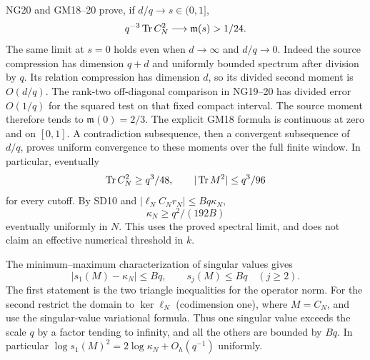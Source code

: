 \documentclass[11pt]{article}
\begin{document}
NG20 and GM18--20 prove, if $d/q\to s\in(0,1]$,
\[
q^{-3}\operatorname{Tr} C_N^2\longrightarrow\mathfrak m(s)>1/24.
\]
The same limit at $s=0$ holds even when $d\to\infty$ and $d/q\to0$.
Indeed the source compression has dimension $q+d$ and uniformly
bounded spectrum after division by $q$. Its relation compression has
dimension $d$, so its divided second moment is $O(d/q)$. The rank-two
off-diagonal comparison in NG19--20 has divided error $O(1/q)$ for
the squared test on that fixed compact interval. The source moment
therefore tends to $\mathfrak m(0)=2/3$. The explicit GM18 formula
is continuous at zero and on $[0,1]$. A contradiction subsequence,
then a convergent subsequence of $d/q$, proves uniform convergence to
these moments over the full finite window. In particular, eventually
\[
\operatorname{Tr} C_N^2\ge q^3/48,\qquad |\operatorname{Tr} M^2|\le q^3/96
\]
for every cutoff. By SD10 and $|\ell_N C_Nr_N|\le Bq\kappa_N$,
\begin{equation}\tag{SD11}
\boxed{\kappa_N\ge q^2/(192B)}
\end{equation}
eventually uniformly in $N$. This uses the proved spectral limit, and
does not claim an effective numerical threshold in $k$.

The minimum--maximum characterization of singular values gives
\begin{equation}\tag{SD12}
|s_1(M)-\kappa_N|\le Bq,\qquad s_j(M)\le Bq\quad(j\ge2).
\end{equation}
The first statement is the two triangle inequalities for the operator
norm. For the second restrict the domain to $\ker\ell_N$ (codimension
one), where $M=C_N$, and use the singular-value variational formula.
Thus one singular value exceeds the scale $q$ by a factor tending to
infinity, and all the others are bounded by $Bq$. In particular
$\log s_1(M)^2=2\log\kappa_N+O_h(q^{-1})$ uniformly.
\end{document}
